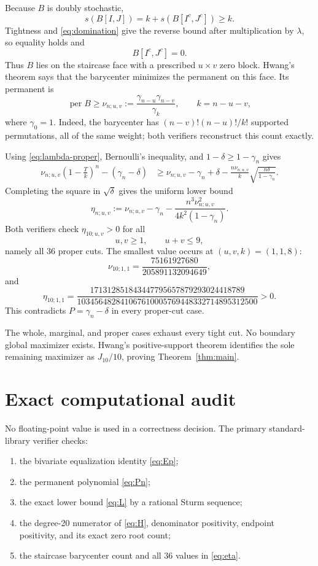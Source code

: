 \documentclass[11pt]{article}
\theoremstyle{remark}
\newcommand{\per}{\operatorname{per}}
\begin{document}
Because $B$ is doubly stochastic,
\[
 s(B[I,J])=k+s(B[I^c,J^c])\ge k.
\]
Tightness and \eqref{eq:domination} give the reverse bound after
multiplication by $\lambda$, so equality holds and
\begin{equation}\label{eq:zero-block}
 B[I^c,J^c]=0.
\end{equation}
Thus $B$ lies on the staircase face with a prescribed $u\times v$ zero
block.  Hwang's theorem says that the barycenter minimizes the permanent on
this face.  Its permanent is
\begin{equation}\label{eq:nu}
 \per B\ge\nu_{n;u,v}
 :=\frac{\gamma_{n-u}\gamma_{n-v}}{\gamma_k},
 \qquad k=n-u-v,
\end{equation}
where $\gamma_0=1$.  Indeed, the barycenter has
$(n-v)!(n-u)!/k!$ supported permutations, all of the same weight; both
verifiers reconstruct this count exactly.

Using \eqref{eq:lambda-proper}, Bernoulli's inequality, and
$1-\delta\ge1-\gamma_n$ gives
\begin{align*}
 \nu_{n;u,v}\left(1-\frac Tk\right)^n-(\gamma_n-\delta)
 &\ge \nu_{n;u,v}-\gamma_n+\delta
 -\frac{n\nu_{n;u,v}}k
  \sqrt{\frac{n\delta}{1-\gamma_n}}.
\end{align*}
Completing the square in $\sqrt\delta$ gives the uniform lower bound
\begin{equation}\label{eq:eta}
 \eta_{n;u,v}
 :=\nu_{n;u,v}-\gamma_n
 -\frac{n^3\nu_{n;u,v}^2}{4k^2(1-\gamma_n)}.
\end{equation}
Both verifiers check $\eta_{10;u,v}>0$ for all
\[
 u,v\ge1,\qquad u+v\le9,
\]
namely all 36 proper cuts.  The smallest value occurs at $(u,v,k)=(1,1,8)$:
\[
 \nu_{10;1,1}=\frac{75161927680}{205891132094649},
\]
and
\[
 \eta_{10;1,1}
 =\frac{171312851843447795657879293024418789}
 {103456482841067610005769448332714895312500}>0.
\]
This contradicts $P=\gamma_n-\delta$ in every proper-cut case.

The whole, marginal, and proper cases exhaust every tight cut.  No boundary
global maximizer exists.  Hwang's positive-support theorem identifies the
sole remaining maximizer as $J_{10}/10$, proving
Theorem~\ref{thm:main}.

\section{Exact computational audit}

No floating-point value is used in a correctness decision.  The primary
standard-library verifier checks:
\begin{enumerate}
\item the bivariate equalization identity \eqref{eq:Ep};
\item the permanent polynomial \eqref{eq:Pn};
\item the exact lower bound \eqref{eq:L} by a rational Sturm sequence;
\item the degree-20 numerator of \eqref{eq:H}, denominator positivity,
endpoint positivity, and its exact zero root count;
\item the staircase barycenter count and all 36 values in \eqref{eq:eta}.
\end{enumerate}
\end{document}
